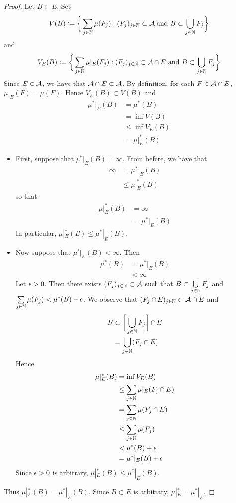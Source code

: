 \documentclass{book}
\begin{document}
	\begin{proof}
		Let $B \subset E$. Set
		$$V(B) \vcentcolon= \bigg \{\sum\limits_{j \in \mathbb{N}} \mu(F_j): (F_j)_{j \in \mathbb{N}} \subset \mathcal{A} \text{ and } B \subset \bigcup\limits_{j \in \mathbb{N}} F_j \bigg \}$$ 
		and 
		$$V_E(B) \vcentcolon= \bigg \{\sum\limits_{j \in \mathbb{N}} \mu|_E(F_j): (F_j)_{j \in \mathbb{N}} \subset \mathcal{A} \cap E \text{ and } B \subset \bigcup\limits_{j \in \mathbb{N}} F_j \bigg \}$$
		Since $E \in \mathcal{A}$, we have that $\mathcal{A} \cap E \subset \mathcal{A}$. By definition, for each $F \in \mathcal{A} \cap E$, $\mu|_E(F) = \mu(F)$. Hence $V_E(B) \subset V(B)$ and
		\begin{align*}
			\mu^*|_E(B)
			& = \mu^*(B) \\
			& = \inf V(B) \\
			& \leq \inf V_E(B) \\
			& = \mu|_E^*(B)
		\end{align*}
		\begin{itemize}
			\item First, suppose that $\mu^*|_E(B) = \infty$. From before, we have that
			\begin{align*}
				\infty
				& = \mu^*|_E(B) \\
				& \leq \mu|_E^*(B) 
			\end{align*}
			so that 
			\begin{align*}
				\mu|_E^*(B)
				& = \infty \\
				& = \mu^*|_E(B)
			\end{align*}
			In particular, $\mu|_E^*(B) \leq \mu^*|_E(B)$.
			\item Now suppose that $\mu^*|_E(B) < \infty$. Then  
			\begin{align*}
				\mu^*(B) 
				& = \mu^*|_E(B) \\
				& < \infty 
			\end{align*}
			Let $\epsilon >0$. Then there exists $(F_j)_{j \in \mathbb{N}} \subset \mathcal{A}$ such that $B \subset \bigcup\limits_{j \in \mathbb{N}} F_j$ and $\sum\limits_{j \in \mathbb{N}} \mu(F_j) < \mu^*(B) + \epsilon$. We observe that $(F_j \cap E)_{j \in \mathbb{N}} \subset \mathcal{A} \cap E$ and 
			\begin{align*}
				B 
				& \subset \bigg[ \bigcup_{j \in \mathbb{N}} F_j \bigg] \cap E \\
				& = \bigcup_{j \in \mathbb{N}} (F_j \cap E) 
			\end{align*}
			Hence
			\begin{align*}
				\mu|_E^*(B)
				& = \inf V_E(B) \\
				& \leq \sum\limits_{j \in \mathbb{N}} \mu|_E(F_j \cap E) \\
				& = \sum\limits_{j \in \mathbb{N}} \mu(F_j \cap E) \\  
				& \leq \sum\limits_{j \in \mathbb{N}} \mu(F_j) \\
				& < \mu^*(B) + \epsilon \\
				& = \mu^*|_E(B) + \epsilon  
			\end{align*}
			Since $\epsilon >0$ is arbitrary, $\mu|_E^*(B) \leq \mu^*|_E(B)$. 
		\end{itemize}
		Thus $\mu|_E^*(B) = \mu^*|_E(B)$. Since $B \subset E$ is arbitrary, $\mu|_E^* = \mu^*|_E$.
	\end{proof}
	
\end{document}
